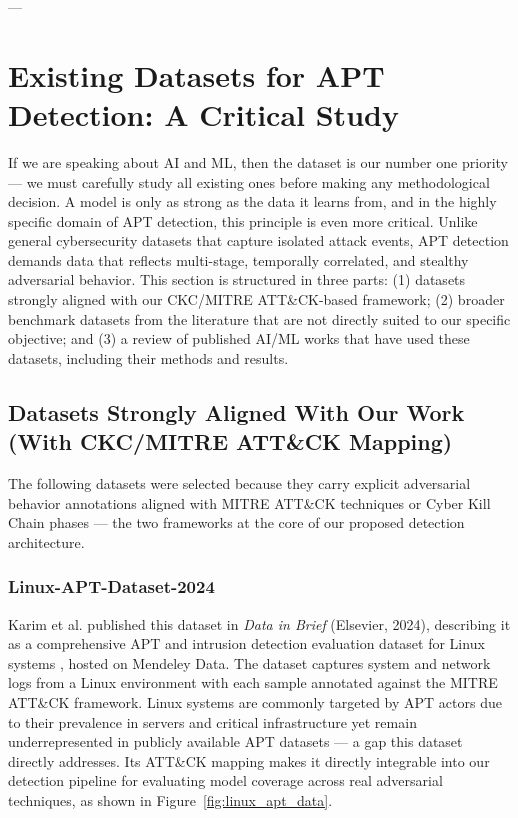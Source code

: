 ---

\section{Existing Datasets for APT Detection: A Critical Study}

If we are speaking about AI and ML, then the dataset is our number one priority — we must carefully study all existing ones before making any methodological decision. A model is only as strong as the data it learns from, and in the highly specific domain of APT detection, this principle is even more critical. Unlike general cybersecurity datasets that capture isolated attack events, APT detection demands data that reflects multi-stage, temporally correlated, and stealthy adversarial behavior. This section is structured in three parts: (1) datasets strongly aligned with our CKC/MITRE ATT\&CK-based framework; (2) broader benchmark datasets from the literature that are not directly suited to our specific objective; and (3) a review of published AI/ML works that have used these datasets, including their methods and results.

\subsection{Datasets Strongly Aligned With Our Work (With CKC/MITRE ATT\&CK Mapping)}

The following datasets were selected because they carry explicit adversarial behavior annotations aligned with MITRE ATT\&CK techniques or Cyber Kill Chain phases — the two frameworks at the core of our proposed detection architecture.

\subsubsection{Linux-APT-Dataset-2024}

Karim et al. published this dataset in \textit{Data in Brief} (Elsevier, 2024), describing it as a comprehensive APT and intrusion detection evaluation dataset for Linux systems \cite{karim2024linux}, hosted on Mendeley Data. The dataset captures system and network logs from a Linux environment with each sample annotated against the MITRE ATT\&CK framework. Linux systems are commonly targeted by APT actors due to their prevalence in servers and critical infrastructure yet remain underrepresented in publicly available APT datasets — a gap this dataset directly addresses. Its ATT\&CK mapping makes it directly integrable into our detection pipeline for evaluating model coverage across real adversarial techniques, as shown in Figure~\ref{fig:linux_apt_data}.

